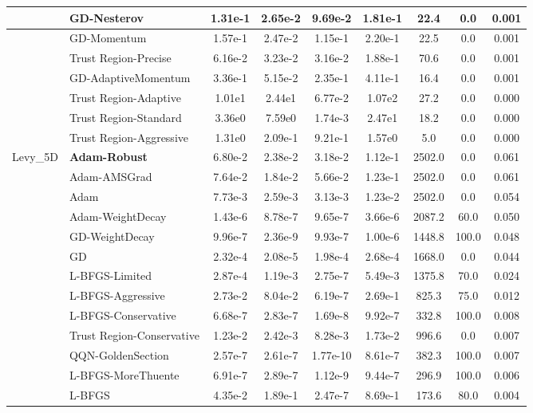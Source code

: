 \documentclass[10pt]{article}
\begin{document}
\begin{longtable}{|l|l|c|c|c|c|c|c|c|}
\hline
 & GD-Nesterov & 1.31e-1 & 2.65e-2 & 9.69e-2 & 1.81e-1 & 22.4 & 0.0 & 0.001 \\
\hline
 & GD-Momentum & 1.57e-1 & 2.47e-2 & 1.15e-1 & 2.20e-1 & 22.5 & 0.0 & 0.001 \\
\hline
 & Trust Region-Precise & 6.16e-2 & 3.23e-2 & 3.16e-2 & 1.88e-1 & 70.6 & 0.0 & 0.001 \\
\hline
 & GD-AdaptiveMomentum & 3.36e-1 & 5.15e-2 & 2.35e-1 & 4.11e-1 & 16.4 & 0.0 & 0.001 \\
\hline
 & Trust Region-Adaptive & 1.01e1 & 2.44e1 & 6.77e-2 & 1.07e2 & 27.2 & 0.0 & 0.000 \\
\hline
 & Trust Region-Standard & 3.36e0 & 7.59e0 & 1.74e-3 & 2.47e1 & 18.2 & 0.0 & 0.000 \\
\hline
 & Trust Region-Aggressive & 1.31e0 & 2.09e-1 & 9.21e-1 & 1.57e0 & 5.0 & 0.0 & 0.000 \\
Levy\_5D & \textbf{Adam-Robust} & 6.80e-2 & 2.38e-2 & 3.18e-2 & 1.12e-1 & 2502.0 & 0.0 & 0.061 \\
\hline
 & Adam-AMSGrad & 7.64e-2 & 1.84e-2 & 5.66e-2 & 1.23e-1 & 2502.0 & 0.0 & 0.061 \\
\hline
 & Adam & 7.73e-3 & 2.59e-3 & 3.13e-3 & 1.23e-2 & 2502.0 & 0.0 & 0.054 \\
\hline
 & Adam-WeightDecay & 1.43e-6 & 8.78e-7 & 9.65e-7 & 3.66e-6 & 2087.2 & 60.0 & 0.050 \\
\hline
 & GD-WeightDecay & 9.96e-7 & 2.36e-9 & 9.93e-7 & 1.00e-6 & 1448.8 & 100.0 & 0.048 \\
\hline
 & GD & 2.32e-4 & 2.08e-5 & 1.98e-4 & 2.68e-4 & 1668.0 & 0.0 & 0.044 \\
\hline
 & L-BFGS-Limited & 2.87e-4 & 1.19e-3 & 2.75e-7 & 5.49e-3 & 1375.8 & 70.0 & 0.024 \\
\hline
 & L-BFGS-Aggressive & 2.73e-2 & 8.04e-2 & 6.19e-7 & 2.69e-1 & 825.3 & 75.0 & 0.012 \\
\hline
 & L-BFGS-Conservative & 6.68e-7 & 2.83e-7 & 1.69e-8 & 9.92e-7 & 332.8 & 100.0 & 0.008 \\
\hline
 & Trust Region-Conservative & 1.23e-2 & 2.42e-3 & 8.28e-3 & 1.73e-2 & 996.6 & 0.0 & 0.007 \\
\hline
 & QQN-GoldenSection & 2.57e-7 & 2.61e-7 & 1.77e-10 & 8.61e-7 & 382.3 & 100.0 & 0.007 \\
\hline
 & L-BFGS-MoreThuente & 6.91e-7 & 2.89e-7 & 1.12e-9 & 9.44e-7 & 296.9 & 100.0 & 0.006 \\
\hline
 & L-BFGS & 4.35e-2 & 1.89e-1 & 2.47e-7 & 8.69e-1 & 173.6 & 80.0 & 0.004 \\

\end{longtable}
\end{document}
